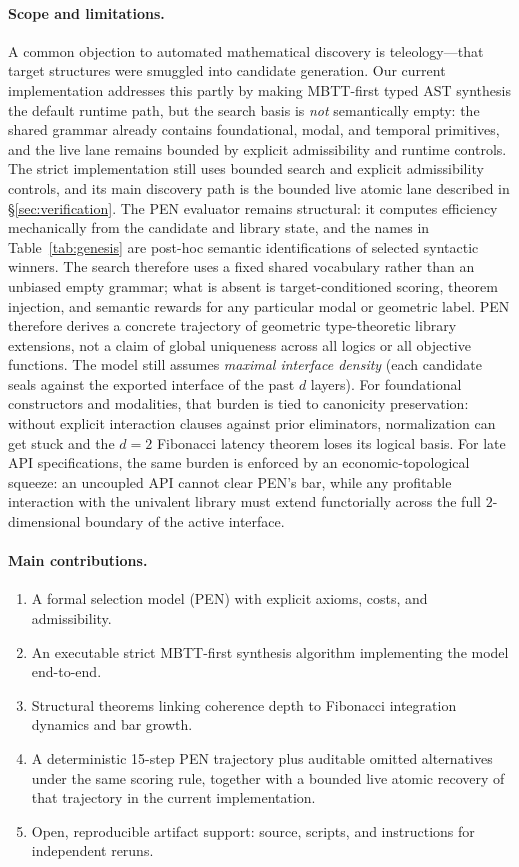 \documentclass[11pt,a4paper]{article}
\theoremstyle{plain}
\theoremstyle{definition}
\theoremstyle{remark}
\begin{document}
\paragraph{Scope and limitations.}
A common objection to automated mathematical discovery is teleology---that target structures were smuggled into candidate generation.
Our current implementation addresses this partly by making MBTT-first typed AST synthesis the default runtime path, but the search basis is \emph{not} semantically empty: the shared grammar already contains foundational, modal, and temporal primitives, and the live lane remains bounded by explicit admissibility and runtime controls.
The strict implementation still uses bounded search and explicit admissibility controls, and its main discovery path is the bounded live atomic lane described in \S\ref{sec:verification}.
The PEN evaluator remains structural: it computes efficiency mechanically from the candidate and library state, and the names in Table~\ref{tab:genesis} are post-hoc semantic identifications of selected syntactic winners.
The search therefore uses a fixed shared vocabulary rather than an unbiased empty grammar; what is absent is target-conditioned scoring, theorem injection, and semantic rewards for any particular modal or geometric label.
PEN therefore derives a concrete trajectory of geometric type-theoretic library extensions, not a claim of global uniqueness across all logics or all objective functions.
The model still assumes \emph{maximal interface density} (each candidate seals against the exported interface of the past $d$ layers).
For foundational constructors and modalities, that burden is tied to canonicity preservation: without explicit interaction clauses against prior eliminators, normalization can get stuck and the $d=2$ Fibonacci latency theorem loses its logical basis.
For late API specifications, the same burden is enforced by an economic-topological squeeze: an uncoupled API cannot clear PEN's bar, while any profitable interaction with the univalent library must extend functorially across the full $2$-dimensional boundary of the active interface.

\paragraph{Main contributions.}
\begin{enumerate}[nosep]
    \item A formal selection model (PEN) with explicit axioms, costs, and admissibility.
    \item An executable strict MBTT-first synthesis algorithm implementing the model end-to-end.
    \item Structural theorems linking coherence depth to Fibonacci integration dynamics and bar growth.
    \item A deterministic 15-step PEN trajectory plus auditable omitted alternatives under the same scoring rule, together with a bounded live atomic recovery of that trajectory in the current implementation.
    \item Open, reproducible artifact support: source, scripts, and instructions for independent reruns.
\end{enumerate}
\end{document}
